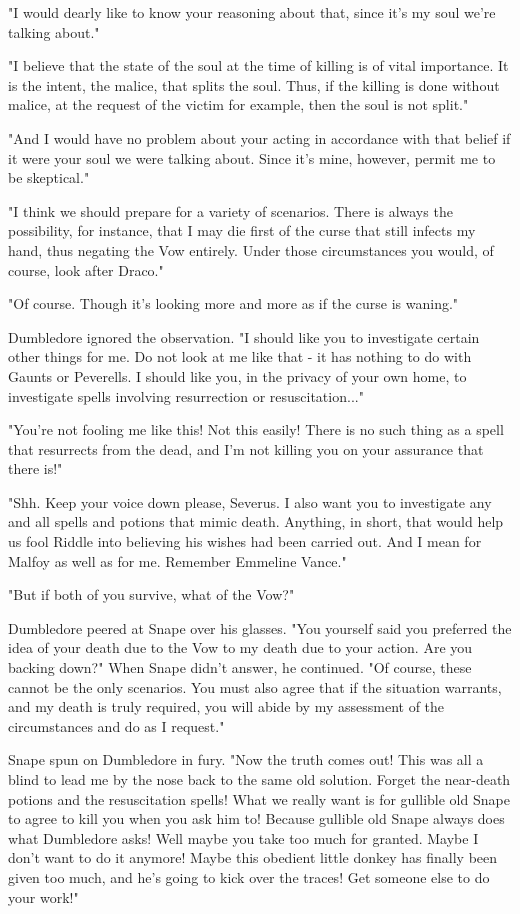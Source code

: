 \documentclass[a4paper,11pt]{article}
\begin{document}
"I would dearly like to know your reasoning about that, since it's my soul we're talking about."

"I believe that the state of the soul at the time of killing is of vital importance. It is the intent, the malice, that splits the soul. Thus, if the killing is done without malice, at the request of the victim for example, then the soul is not split."

"And I would have no problem about your acting in accordance with that belief if it were your soul we were talking about. Since it's mine, however, permit me to be skeptical."

"I think we should prepare for a variety of scenarios. There is always the possibility, for instance, that I may die first of the curse that still infects my hand, thus negating the Vow entirely. Under those circumstances you would, of course, look after Draco."

"Of course. Though it's looking more and more as if the curse is waning."

Dumbledore ignored the observation. "I should like you to investigate certain other things for me. Do not look at me like that - it has nothing to do with Gaunts or Peverells. I should like you, in the privacy of your own home, to investigate spells involving resurrection or resuscitation..."

"You're not fooling me like this! Not this easily! There is no such thing as a spell that resurrects from the dead, and I'm not killing you on your assurance that there is!"

"Shh. Keep your voice down please, Severus. I also want you to investigate any and all spells and potions that mimic death. Anything, in short, that would help us fool Riddle into believing his wishes had been carried out. And I mean for Malfoy as well as for me. Remember Emmeline Vance."

"But if both of you survive, what of the Vow?"

Dumbledore peered at Snape over his glasses. "You yourself said you preferred the idea of your death due to the Vow to my death due to your action. Are you backing down?" When Snape didn't answer, he continued. "Of course, these cannot be the only scenarios. You must also agree that if the situation warrants, and my death is truly required, you will abide by my assessment of the circumstances and do as I request."

Snape spun on Dumbledore in fury. "Now the truth comes out! This was all a blind to lead me by the nose back to the same old solution. Forget the near-death potions and the resuscitation spells! What we really want is for gullible old Snape to agree to kill you when you ask him to! Because gullible old Snape always does what Dumbledore asks! Well maybe you take too much for granted. Maybe I don't want to do it anymore! Maybe this obedient little donkey has finally been given too much, and he's going to kick over the traces! Get someone else to do your work!"
\end{document}
